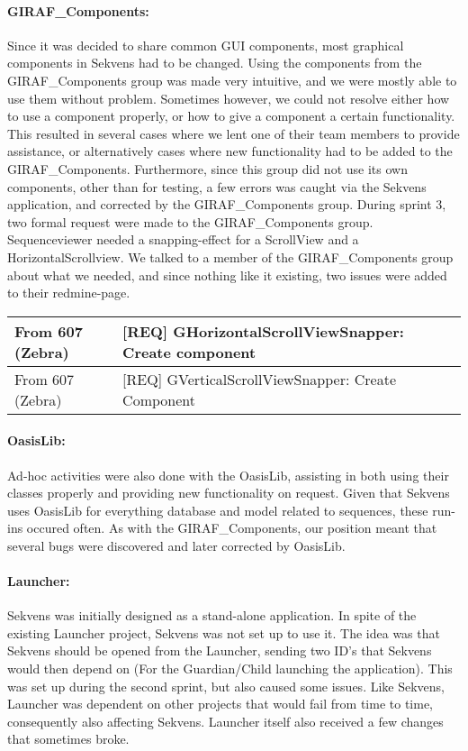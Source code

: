 \paragraph{GIRAF\_Components:}
Since it was decided to share common GUI components, most graphical components in Sekvens had to be changed. Using the components from the GIRAF\_Components group was made very intuitive, and we were mostly able to use them without problem. Sometimes however, we could not resolve either how to use a component properly, or how to give a component a certain functionality. This resulted in several cases where we lent one of their team members to provide assistance, or alternatively cases where new functionality had to be added to the GIRAF\_Components.  Furthermore, since this group did not use its own components, other than for testing, a few errors was caught via the Sekvens application, and corrected by the GIRAF\_Components group.\newline
\newline
\label{collaborationSnapper}During sprint 3, two formal request were made to the GIRAF\_Components group. Sequenceviewer needed a snapping-effect for a ScrollView and a HorizontalScrollview. We talked to a member of the GIRAF\_Components group about what we needed, and since nothing like it existing, two issues were added to their redmine-page. \newline

\begin{tabular}{| l | l |}
  \hline                       
[REQUEST] From 607 (Zebra) & [REQ] GHorizontalScrollViewSnapper: Create component \\ \hline
[REQUEST] From 607 (Zebra) & [REQ] GVerticalScrollViewSnapper: Create Component \\
  \hline  
\end{tabular}

\paragraph{OasisLib:}
Ad-hoc activities were also done with the OasisLib, assisting in both using their classes properly and providing new functionality on request. Given that Sekvens uses OasisLib for everything database and model related to sequences, these run-ins occured often. As with the GIRAF\_Components, our position meant that several bugs were discovered and later corrected by OasisLib.

\paragraph{Launcher:}
Sekvens was initially designed as a stand-alone application. In spite of the existing Launcher project, Sekvens was not set up to use it. The idea was that Sekvens should be opened from the Launcher, sending two ID's that Sekvens would then depend on (For the Guardian/Child launching the application). This was set up during the second sprint, but also caused some issues. Like Sekvens, Launcher was dependent on other projects that would fail from time to time, consequently also affecting Sekvens. Launcher itself also received a few changes that sometimes broke.

